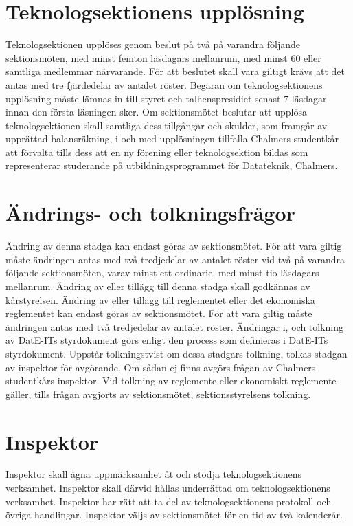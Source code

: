 \documentclass[a4paper]{dtek}
\begin{document}
\section{Teknologsektionens upplösning}
 Teknologsektionen upplöses genom beslut på två på varandra följande sektionsmöten, med minst femton läsdagars mellanrum, med minst 60 eller samtliga medlemmar närvarande. För att beslutet skall vara giltigt krävs att det antas med tre fjärdedelar av antalet röster. Begäran om teknologsektionens upplösning måste lämnas in till styret och talhenspresidiet senast 7 läsdagar innan den första läsningen sker.
 Om sektionsmötet beslutar att upplösa teknologsektionen skall samtliga dess tillgångar och skulder, som framgår av upprättad balansräkning, i och med upplösningen tillfalla Chalmers studentkår att förvalta tills dess att en ny förening eller teknologsektion bildas som representerar studerande på utbildningsprogrammet för Datateknik, Chalmers.
\section{Ändrings- och tolkningsfrågor}
\para[Stadgeändringar] Ändring av denna stadga kan endast göras av sektionsmötet. För att vara giltig måste ändringen antas med två tredjedelar av antalet röster vid två på varandra följande sektionsmöten, varav minst ett ordinarie, med minst tio läsdagars mellanrum.
\stycke Ändring av eller tillägg till denna stadga skall godkännas av kårstyrelsen.
\para[Reglementesändring] Ändring av eller tillägg till reglementet eller det ekonomiska reglementet kan endast göras av sektionsmötet. För att vara giltig måste ändringen antas med två tredjedelar av antalet röster.
 Ändringar i, och tolkning av DatE-ITs styrdokument görs enligt den process som definieras i DatE-ITs styrdokument.
\para[Tolkningstvist] Uppstår tolkningstvist om dessa stadgars tolkning, tolkas stadgan av inspektor för avgörande. Om sådan ej finns avgörs frågan av Chalmers studentkårs inspektor.
\stycke Vid tolkning av reglemente eller ekonomiskt reglemente gäller, tills frågan avgjorts av sektionsmötet, sektionsstyrelsens tolkning.

\section{Inspektor}
\para[Allmänt] Inspektor skall ägna uppmärksamhet åt och stödja teknologsektionens verksamhet. Inspektor skall därvid hållas underrättad om teknologsektionens verksamhet. Inspektor har rätt att ta del av teknologsektionens protokoll och övriga handlingar.
\para[Val] Inspektor väljs av sektionsmötet för en tid av två kalenderår.
\end{document}
